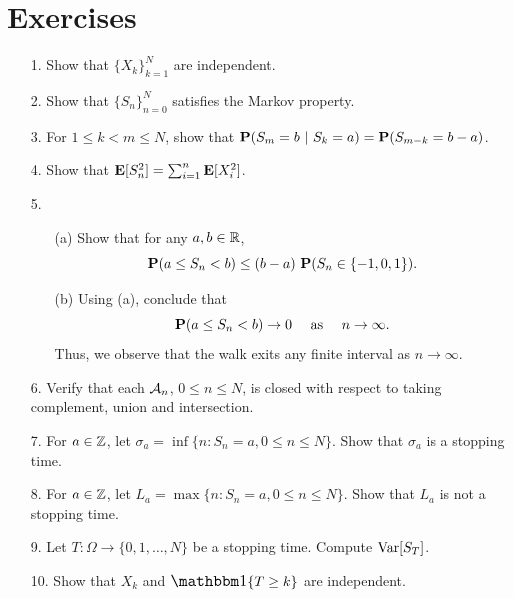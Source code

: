 \documentclass[main]{subfiles}
\begin{document}
\section{Exercises}
\begin{itemize}
    \item[1.]Show that $ \{X_k\}_{k=1}^N $ are independent.
    \item[2.]Show that $ \{S_n\}_{n=0}^N $ satisfies the Markov property.
    \item[3.]For $ 1\le k<m\le N $, show that $ \P(S_m=b\ |\ S_k=a)=\P(S_{m-k}=b-a) $.
    \item[4.]Show that $ \E[S_n^2]=\sum_{i=1}^n\E[X_i^2] $.
    \item[5.]
        \begin{itemize}
            \item[(a)]Show that for any $ a,b\in\R $, \[\P(a\le S_n < b)\le (b-a)\ \P(S_n\in\{-1,0,1\}).\]
            \item[(b)]Using (a), conclude that \[\P(a\le S_n < b) \to 0 \text{$\quad$ as$\quad$ } n\to\infty.\] Thus, we observe that the walk exits any finite interval as $ n\to\infty $.
        \end{itemize}
        \item[6.]Verify that each $ \SA_n $, $ 0\le n\le N $, is closed with respect to taking complement, union and intersection.
        \item[7.]For $ a\in\Z $, let $ \sigma_a=\inf\{n: S_n=a, 0\le n\le N\} $. Show that $ \sigma_a $ is a stopping time.
        \item[8.]For $ a\in\Z $, let $ L_a=\max\{n: S_n=a, 0\le n\le N\}$. Show that $ L_a $ is not a stopping time.
        \item[9.]Let $ T:\Omega\to\{0,1,\ldots,N\} $ be a stopping time. Compute $ \Var[S_T] $.
        \item[10.]Show that $ X_k $ and $ \mathlarger{\one\{T\ge k\}} $ are independent.
\end{itemize}
\end{document}

